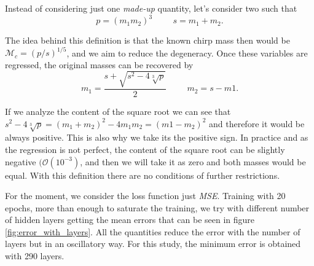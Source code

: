 \documentclass[prd,aps,twocolumn,a4paper,showkeys,nofootinbib]{article}
\begin{document}
Instead of considering just one \textit{made-up} quantity, let's consider two such that
\begin{equation}
p=(m_1m_2)^3 \hspace{1cm} s=m_1+m_2.
\end{equation} 

The idea behind this definition is that the known chirp mass then would be $\mathcal{M}_c=(p/s)^{1/5}$, and we aim to reduce the degeneracy. Once these variables are regressed, the original masses can be recovered by
\begin{equation}
m_1=\frac{s+\sqrt{s^2-4\sqrt[3]{p}}}{2} \hspace{1cm} m_2=s-m1.
\end{equation}

If we analyze the content of the square root we can see that $s^2-4\sqrt[3]{p}=(m_1+m_2)^2-4m_1m_2=(m1-m_2)^2$ and therefore it would be always positive. This is also why we take its the positive sign. In practice and as the regression is not perfect, the content of the square root can be slightly negative $(\mathcal{O}(10^{-3})$, and then we will take it as zero and both masses would be equal. With this definition there are no conditions of further restrictions.

For the moment, we consider the loss function just \textit{MSE}. Training with 20 epochs, more than enough to saturate the training, we try with different number of hidden layers getting the mean errors that can be seen in figure \ref{fig:error_with_layers}. All the quantities reduce the error with the number of layers but in an oscillatory way. For this study, the minimum error is obtained with 290 layers.
\end{document}
